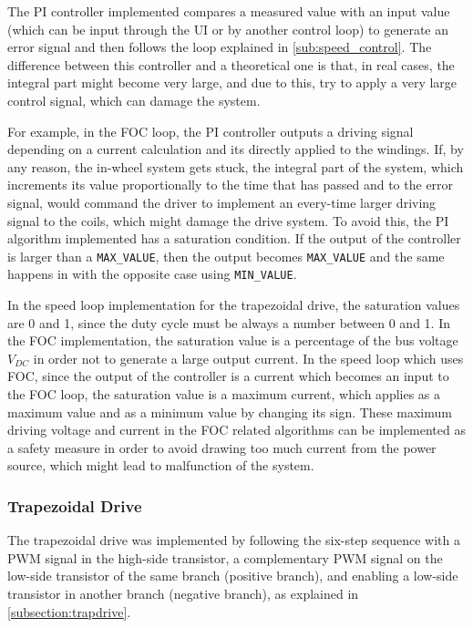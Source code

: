 The \ac{PI} controller implemented compares a measured value with an input value (which can be input through the \ac{UI} or by another control loop) to generate an error signal and then follows the loop explained in \ref{sub:speed_control}. The difference between this controller and a theoretical one is that, in real cases, the integral part might become very large, and due to this, try to apply a very large control signal, which can damage the system.

For example, in the \ac{FOC} loop, the \ac{PI} controller outputs a driving signal depending on a current calculation and its directly applied to the windings. If, by any reason, the in-wheel system gets stuck, the integral part of the system, which increments its value proportionally to the time that has passed and to the error signal, would command the driver to implement an every-time larger driving signal to the coils, which might damage the drive system. To avoid this, the \ac{PI} algorithm implemented has a saturation condition. If the output of the controller is larger than a \texttt{MAX\_VALUE}, then the output becomes \texttt{MAX\_VALUE} and the same happens in with the opposite case using \texttt{MIN\_VALUE}. 

In the speed loop implementation for the trapezoidal drive, the saturation values are 0 and 1, since the duty cycle must be always a number between 0 and 1. In the \ac{FOC} implementation, the saturation value is a percentage of the bus voltage $V_{DC}$ in order not to generate a large output current. In the speed loop which uses \ac{FOC}, since the output of the controller is a current which becomes an input to the \ac{FOC} loop, the saturation value is a maximum current, which applies as a maximum value and as a minimum value by changing its sign. These maximum driving voltage and current in the \ac{FOC} related algorithms can be implemented as a safety measure in order to avoid drawing too much current from the power source, which might lead to malfunction of the system.

\subsubsection{Trapezoidal Drive}

The trapezoidal drive was implemented by following the six-step sequence with a \ac{PWM} signal in the high-side transistor, a complementary \ac{PWM} signal on the low-side transistor of the same branch (positive branch), and enabling a low-side transistor in another branch (negative branch), as explained in \ref{subsection:trapdrive}.

